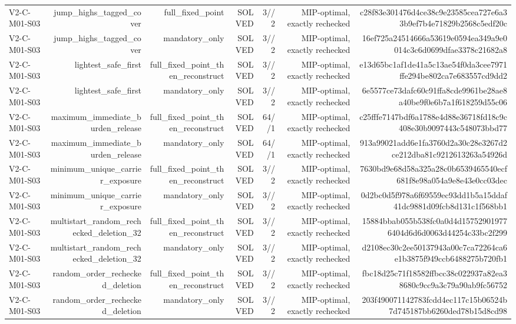 {\begin{longtable}{lrrrrrr}
V2-C-M01-S03 & jump\_highs\_tagged\_cover & full\_fixed\_point & SOLVED & 3//2 & MIP-optimal, exactly rechecked & c28f83e301476d4ce38c9e23585cea727e6a33b9ef7b4e71829b2568c5edf20c \\
V2-C-M01-S03 & jump\_highs\_tagged\_cover & mandatory\_only & SOLVED & 3//2 & MIP-optimal, exactly rechecked & 16ef725a24514666a53619e0594ea349a9e0014c3c6d0699dfae3378c21682a8 \\
V2-C-M01-S03 & lightest\_safe\_first & full\_fixed\_point\_then\_reconstruct & SOLVED & 3//2 & MIP-optimal, exactly rechecked & e13d65bc1af1de41a5c13ae54f0da3cee7971ffe294be802ca7e683557cd9dd2 \\
V2-C-M01-S03 & lightest\_safe\_first & mandatory\_only & SOLVED & 3//2 & MIP-optimal, exactly rechecked & 6e5577ce73dafc60c91ffa8cde9961be28ae8a40be9f0e6b7a1f618259d55c06 \\
V2-C-M01-S03 & maximum\_immediate\_burden\_release & full\_fixed\_point\_then\_reconstruct & SOLVED & 64//1 & MIP-optimal, exactly rechecked & c25fffe7147bdf6a1788e4d88e36718fd18c9c408e30b9097443c548073bbd77 \\
V2-C-M01-S03 & maximum\_immediate\_burden\_release & mandatory\_only & SOLVED & 64//1 & MIP-optimal, exactly rechecked & 913a99021add6e1fa3760d2a30c28e3267d2ce212dba81c9212613263a54926d \\
V2-C-M01-S03 & minimum\_unique\_carrier\_exposure & full\_fixed\_point\_then\_reconstruct & SOLVED & 3//2 & MIP-optimal, exactly rechecked & 7630bd9e68d58a325a28c0b6539465540ecf681f8e98a054a9e8e43e0cc03dec \\
V2-C-M01-S03 & minimum\_unique\_carrier\_exposure & mandatory\_only & SOLVED & 3//2 & MIP-optimal, exactly rechecked & 0d2bc0d5f978a6f69559ec93dd1b5a15ddaf41dc9881d09fcb8d131c1f568bb1 \\
V2-C-M01-S03 & multistart\_random\_rechecked\_deletion\_32 & full\_fixed\_point\_then\_reconstruct & SOLVED & 3//2 & MIP-optimal, exactly rechecked & 15884bbab055b538fc0a0d4d157529019776404d6d6d0063d44254c33bc2f299 \\
V2-C-M01-S03 & multistart\_random\_rechecked\_deletion\_32 & mandatory\_only & SOLVED & 3//2 & MIP-optimal, exactly rechecked & d2108ec30c2ee50137943a00c7ca72264ca6e1b3875f949ccb6488275b720fb1 \\
V2-C-M01-S03 & random\_order\_rechecked\_deletion & full\_fixed\_point\_then\_reconstruct & SOLVED & 3//2 & MIP-optimal, exactly rechecked & fbc18d25c71f18582ffbcc38c022937a82ea38680c9cc9a3c79a90ab9fc56752 \\
V2-C-M01-S03 & random\_order\_rechecked\_deletion & mandatory\_only & SOLVED & 3//2 & MIP-optimal, exactly rechecked & 203f490071142783fcdd4ec117c15b06524b7d745187bb6260ded78b15d8cd98 \\

\end{longtable}}
